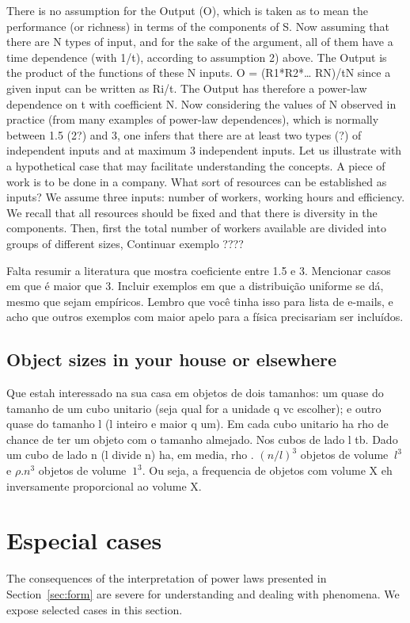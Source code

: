 \documentclass[a4paper, 11pt]{article} %
\begin{document}
There is no assumption for the Output (O), which is taken as to mean the performance (or richness) in terms of the components of S. 
Now assuming that there are N types of input, and for the sake of the argument, all of them have a time dependence (with 1/t), according to assumption 2) above. The Output is the product of the functions of these N inputs. 
O = (R1*R2*… RN)/tN since a given input can be written as Ri/t. 
The Output has therefore a power-law dependence on t with coefficient N. 
Now considering the values of N observed in practice (from many examples of power-law dependences), which is normally between 1.5 (2?) and 3, one infers that there are at least two types (?) of independent inputs and at maximum 3 independent inputs. 
Let us illustrate with a hypothetical case that may facilitate understanding the concepts. A piece of work is to be done in a company. What sort of resources can be established as inputs? We assume three inputs: number of workers, working hours and efficiency. We recall that all resources should be fixed and that there is diversity in the components. 
Then, first the total number of workers available are divided into groups of different sizes,
Continuar exemplo ????

Falta resumir a literatura que mostra coeficiente entre 1.5 e 3. Mencionar casos em que é maior que 3.
Incluir exemplos em que a distribuição uniforme se dá, mesmo que sejam empíricos. Lembro que você tinha isso para lista de e-mails, e acho que outros exemplos com maior apelo para a física precisariam ser incluídos.


\subsection{Object sizes in your house or elsewhere}

Que estah interessado na sua casa em objetos de dois tamanhos: um quase do tamanho de um cubo unitario (seja qual for a unidade q vc escolher); e outro quase do tamanho l (l inteiro e maior q um). Em cada cubo unitario ha rho de chance de ter um objeto com o tamanho almejado. Nos cubos  de lado l tb. Dado um cubo de lado n (l divide n) ha, em media, rho . $(n/l)^3$ objetos de volume $~l^3$ e $\rho . n^3$ objetos de volume $~1^3$. Ou seja, a frequencia de objetos com volume X eh inversamente proporcional ao volume X.
\section{Especial cases}
The consequences of the
interpretation of power laws presented in Section~\ref{sec:form}
are severe for understanding and dealing with
phenomena. We expose selected cases in this section.
\end{document}
